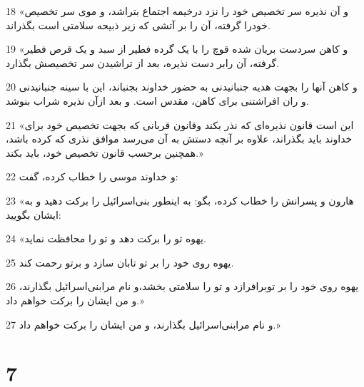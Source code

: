 \par 18 «و آن نذیره سر تخصیص خود را نزد درخیمه اجتماع بتراشد، و موی سر تخصیص خودرا گرفته، آن را بر آتشی که زیر ذبیحه سلامتی است بگذراند.
\par 19 «و کاهن سردست بریان شده قوچ را با یک گرده فطیر از سبد و یک قرص فطیر گرفته، آن رابر دست نذیره، بعد از تراشیدن سر تخصیصش بگذارد.
\par 20 و کاهن آنها را بجهت هدیه جنبانیدنی به حضور خداوند بجنباند، این با سینه جنبانیدنی و ران افراشتنی برای کاهن، مقدس است. و بعد ازآن نذیره شراب بنوشد.
\par 21 «این است قانون نذیره‌ای که نذر بکند وقانون قربانی که بجهت تخصیص خود برای خداوند باید بگذراند، علاوه بر آنچه دستش به آن می‌رسد موافق نذری که کرده باشد، همچنین برحسب قانون تخصیص خود، باید بکند.»
\par 22 و خداوند موسی را خطاب کرده، گفت:
\par 23 «هارون و پسرانش را خطاب کرده، بگو: به اینطور بنی‌اسرائیل را برکت دهید و به ایشان بگویید:
\par 24 «یهوه تو را برکت دهد و تو را محافظت نماید.
\par 25 یهوه روی خود را بر تو تابان سازد و برتو رحمت کند.
\par 26 یهوه روی خود را بر توبرافرازد و تو را سلامتی بخشد،و نام مرابنی‌اسرائیل بگذارند، و من ایشان را برکت خواهم داد.»
\par 27 و نام مرابنی‌اسرائیل بگذارند، و من ایشان را برکت خواهم داد.»
 
\chapter{7}

